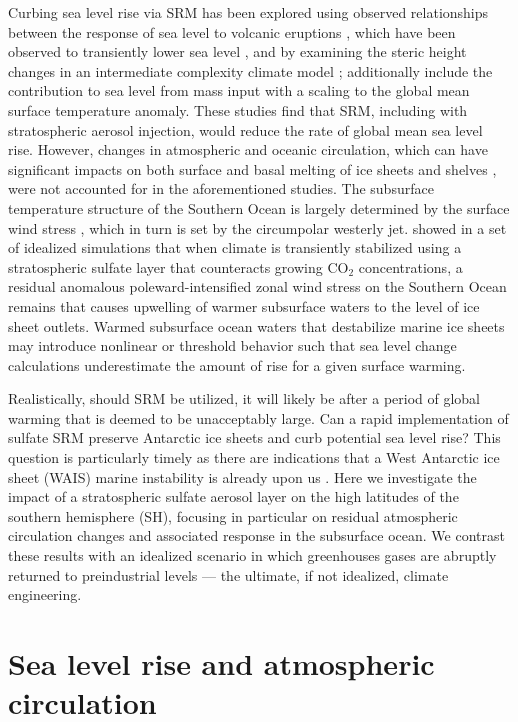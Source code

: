 \documentclass{nature}
\begin{document}
Curbing sea level rise via SRM has been explored using observed relationships between the response of sea level to volcanic eruptions \cite{moore10}, which have been observed to transiently lower sea level \cite{church05,gleckler06}, and by examining the steric height changes in an intermediate complexity climate model \cite{irvine12}; \cite{irvine12} additionally include the contribution to sea level from mass input with a scaling to the global mean surface temperature anomaly. These studies find that SRM, including with stratospheric aerosol injection, would reduce the rate of global mean sea level rise. However, changes in atmospheric and oceanic circulation, which can have significant impacts on both surface and basal melting of ice sheets and shelves \cite{steig13,joughin11,thoma08}, were not accounted for in the aforementioned studies. The subsurface temperature structure of the Southern Ocean is largely determined by the surface wind stress \cite{fyfe07}, which in turn is set by the circumpolar westerly jet. \cite{mccusker12} showed in a set of idealized simulations that when climate is transiently stabilized using a stratospheric sulfate layer that counteracts growing CO$_2$ concentrations, a residual anomalous poleward-intensified zonal wind stress on the Southern Ocean remains that causes upwelling of warmer subsurface waters to the level of ice sheet outlets. Warmed subsurface ocean waters that destabilize marine ice sheets may introduce nonlinear or threshold behavior \cite{notz09} such that sea level change calculations underestimate the amount of rise for a given surface warming.

Realistically, should SRM be utilized, it will likely be after a period of global warming that is deemed to be unacceptably large. Can a rapid implementation of sulfate SRM preserve Antarctic ice sheets and curb potential sea level rise? This question is particularly timely as there are indications that a West Antarctic ice sheet (WAIS) marine instability is already upon us \cite{favier14,rignot14}. Here we investigate the impact of a stratospheric sulfate aerosol layer on the high latitudes of the southern hemisphere (SH), focusing in particular on residual atmospheric circulation changes and associated response in the subsurface ocean. We contrast these results with an idealized scenario in which greenhouses gases are abruptly returned to preindustrial levels --- the ultimate, if not idealized, climate engineering. 

\section{Sea level rise and atmospheric circulation}
\end{document}

